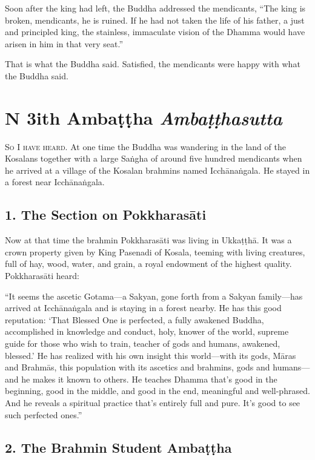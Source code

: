 \documentclass[12pt,openany]{book}%
\newcommand*{\suttatitleacronym}[1]{\smaller[2]{#1}\vspace*{.3em}}
\newcommand*{\suttatitletranslation}[1]{\linebreak{#1}}
\newcommand*{\suttatitleroot}[1]{\linebreak\smaller[2]\itshape{#1}}
\newcommand*{\tocacronym}[1]{\hspace*{-3.3em}{#1}\quad}
\newcommand*{\toctranslation}[1]{#1}
\newcommand*{\tocroot}[1]{(\textit{#1})}
\newcommand*{\scevam}[1]{\textsc{#1}}
\begin{document}
Soon after the king had left, the Buddha addressed the mendicants, “The king is broken, mendicants, he is ruined. If he had not taken the life of his father, a just and principled king, the stainless, immaculate vision of the Dhamma would have arisen in him in that very seat.” 

That is what the Buddha said. Satisfied, the mendicants were happy with what the Buddha said. 

%
\chapter*{{\suttatitleacronym DN 3}{\suttatitletranslation With Ambaṭṭha }{\suttatitleroot Ambaṭṭhasutta}}
\addcontentsline{toc}{chapter}{\tocacronym{DN 3} \toctranslation{With Ambaṭṭha } \tocroot{Ambaṭṭhasutta}}

\scevam{So I have heard. }At one time the Buddha was wandering in the land of the Kosalans together with a large \textsanskrit{Saṅgha} of around five hundred mendicants when he arrived at a village of the Kosalan brahmins named \textsanskrit{Icchānaṅgala}. He stayed in a forest near \textsanskrit{Icchānaṅgala}. 

\section*{1. The Section on \textsanskrit{Pokkharasāti} }

Now at that time the brahmin \textsanskrit{Pokkharasāti} was living in \textsanskrit{Ukkaṭṭhā}. It was a crown property given by King Pasenadi of Kosala, teeming with living creatures, full of hay, wood, water, and grain, a royal endowment of the highest quality. \textsanskrit{Pokkharasāti} heard: 

“It seems the ascetic Gotama—a Sakyan, gone forth from a Sakyan family—has arrived at \textsanskrit{Icchānaṅgala} and is staying in a forest nearby. He has this good reputation: ‘That Blessed One is perfected, a fully awakened Buddha, accomplished in knowledge and conduct, holy, knower of the world, supreme guide for those who wish to train, teacher of gods and humans, awakened, blessed.’ He has realized with his own insight this world—with its gods, \textsanskrit{Māras} and \textsanskrit{Brahmās}, this population with its ascetics and brahmins, gods and humans—and he makes it known to others. He teaches Dhamma that’s good in the beginning, good in the middle, and good in the end, meaningful and well-phrased. And he reveals a spiritual practice that’s entirely full and pure. It’s good to see such perfected ones.” \section*{2. The Brahmin Student \textsanskrit{Ambaṭṭha} }
\end{document}
